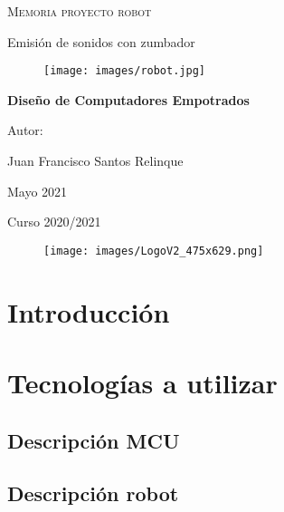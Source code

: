 \documentclass[a4paper]{article}
\begin{document}
\begin{titlepage}
	\centering
	\vspace{5cm}
	{\scshape\Huge Memoria proyecto robot \par}
	{\LARGE Emisión de sonidos con zumbador \par}
	\begin{figure}[H]
		\centering
		\texttt{[image: images/robot.jpg]}
	\end{figure}
	{\bfseries\LARGE Diseño de Computadores Empotrados \par}
	{\Large Autor: \par}
	{\Large Juan Francisco Santos Relinque \par}
	{\Large Mayo 2021 \par}
	{\large Curso 2020/2021 \par}
	\begin{figure}[H]
		\raggedleft
		\texttt{[image: images/LogoV2\_475x629.png]}
	\end{figure}
\end{titlepage}
	
\newpage
\hypersetup{linkcolor=black}
\tableofcontents
\hypersetup{linkcolor=blue}

\newpage
\section{Introducción}

\section{Tecnologías a utilizar}

	\subsection{Descripción MCU}
	
	\subsection{Descripción robot}
	
\end{document}
